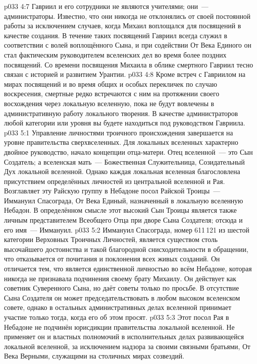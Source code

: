 \vs p033 4:7 \pc Гавриил и его сотрудники не являются учителями; они~--- администраторы. Известно, что они никогда не отклонялись от своей постоянной работы за исключением случаев, когда Михаил воплощался для посвящений в качестве создания. В течение таких посвящений Гавриил всегда служил в соответствии с волей воплощённого Сына, и при содействии От Века Единого он стал фактическим руководителем вселенских дел во время более поздних посвящений. Со времени посвящения Михаила в облике смертного Гавриил тесно связан с историей и развитием Урантии.
\vs p033 4:8 Кроме встреч с Гавриилом на мирах посвящений и во время общих и особых перекличек по случаю воскресения, смертные редко встречаются с ним на протяжении своего восхождения через локальную вселенную, пока не будут вовлечены в административную работу локального творения. В качестве администраторов любой категории или уровня вы будете находиться под руководством Гавриила.
\vs p033 5:1 Управление личностями троичного происхождения завершается на уровне правительства сверхвселенных. Для локальных вселенных характерно двойное руководство, начало концепции отца\hyp{}матери. Отец вселенной~--- это Сын Создатель; а вселенская мать~--- Божественная Служительница, Созидательный Дух локальной вселенной. Однако каждая локальная вселенная благословлена присутствием определённых личностей из центральной вселенной и Рая. Возглавляет эту Райскую группу в Небадоне посол Райской Троицы~--- Иммануил Спасограда, От Века Единый, назначенный в локальную вселенную Небадон. В определённом смысле этот высокий Сын Троицы является также личным представителем Всеобщего Отца при дворе Сына Создателя; отсюда и его имя~--- Иммануил.
\vs p033 5:2 Иммануил Спасограда, номер 611\,121 из шестой категории Верховных Троичных Личностей, является существом столь высочайшего достоинства и такой благородной снисходительности в обращении, что отказывается от почитания и поклонения всех живых созданий. Он отличается тем, что является единственной личностью во всём Небадоне, которая никогда не признавала подчинения своему брату Михаилу. Он действует как советник Суверенного Сына, но даёт советы только по просьбе. В отсутствие Сына Создателя он может председательствовать в любом высоком вселенском совете, однако в остальных административных делах вселенной принимает участие только тогда, когда его об этом просят.
\vs p033 5:3 Этот посол Рая в Небадоне не подчинён юрисдикции правительства локальной вселенной. Не применяет он и властных полномочий в исполнительных делах развивающейся локальной вселенной, за исключением надзора за своими связными братьями, От Века Верными, служащими на столичных мирах созвездий.
